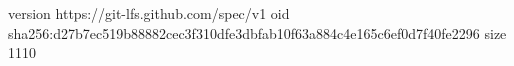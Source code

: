 version https://git-lfs.github.com/spec/v1
oid sha256:d27b7ec519b88882cec3f310dfe3dbfab10f63a884c4e165c6ef0d7f40fe2296
size 1110
